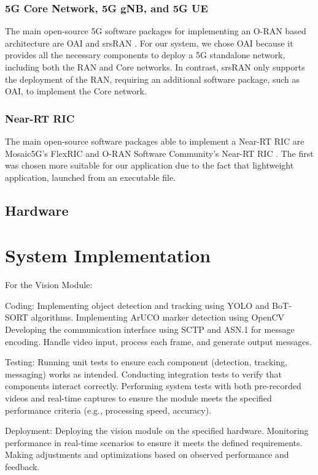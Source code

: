 \subsubsection{5G Core Network, 5G gNB, and 5G UE}
The main open-source 5G software packages for implementing an O-RAN based architecture are OAI \cite[]{} and srsRAN \cite[]{}. For our system, we chose OAI because it provides all the necessary components to deploy a 5G standalone network, including both the RAN and Core networks. In contrast, srsRAN only supports the deployment of the RAN, requiring an additional software package, such as OAI, to implement the Core network.

\subsubsection{Near-RT RIC}
The main open-source software packages able to implement a Near-RT RIC are Mosaic5G’s FlexRIC \cite[]{} and  O-RAN Software Community’s Near-RT RIC \cite[]{}.
The first was chosen more suitable for our application due to the fact that lightweight application, launched from an executable file.

\subsection{Hardware}

\section{System Implementation}\label{sec:impl}

For the Vision Module:

    Coding:
        Implementing object detection and tracking using YOLO and BoT-SORT algorithms.
        Implementing ArUCO marker detection using OpenCV
        Developing the communication interface using SCTP and ASN.1 for message encoding.
        Handle video input, process each frame, and generate output messages.

    Testing:
        Running unit tests to ensure each component (detection, tracking, messaging) works as intended.
        Conducting integration tests to verify that components interact correctly.
        Performing system tests with both pre-recorded videos and real-time captures to ensure the module meets the specified performance criteria (e.g., processing speed, accuracy).

    Deployment:
        Deploying the vision module on the specified hardware.
        Monitoring performance in real-time scenarios to ensure it meets the defined requirements.
        Making adjustments and optimizations based on observed performance and feedback.

